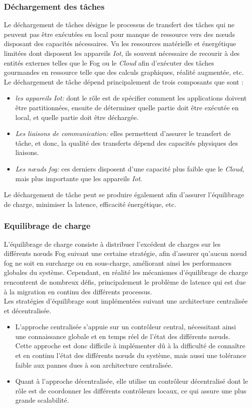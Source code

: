\subsubsection{Déchargement des tâches}
Le déchargement de tâches désigne le processus de transfert des tâches qui ne peuvent pas être exécutées en local pour manque de ressource vers des nœuds disposant des capacités nécessaires. Vu les ressources matérielle et énergétique limitées dont disposent les appareils \emph{Iot}, ils souvent nécessaire de recourir à des entités externes telles que le Fog ou le \emph{Cloud} afin d'exécuter des tâches gourmandes en ressource telle que des calculs graphiques, réalité augmentée, etc.\\
Le déchargement de tâche dépend principalement de trois composants que sont :
\begin{itemize}
  \item \emph{les appareils Iot:} dont le rôle est de spécifier comment les applications doivent être partitionnées, ensuite de déterminer quelle partie doit être exécutée en local, et quelle partie doit être déchargée.
  \item \emph{Les liaisons de communication:}  elles permettent d’assurer le transfert de tâche, et donc, la qualité des transferts dépend des capacités physiques des liaisons.
  \item \emph{Les nœuds fog:} ces derniers disposent d'une capacité plus faible que le \emph{Cloud}, mais plus importante que les appareils \emph{Iot}.
\end{itemize}
Le déchargement de tâche peut se produire également afin d’assurer l’équilibrage de charge, minimiser la latence, efficacité énergétique, etc.
\subsubsection{Equilibrage de charge}
L’équilibrage de charge \cite{Ash2019} consiste à distribuer l'excédent de charges sur les différents nœuds Fog suivant une certaine stratégie, afin d’assurer qu’aucun nœud fog ne soit en surcharge ou en sous-charge, améliorant ainsi les performances globales du système. Cependant, en réalité les mécanismes d’équilibrage de charge rencontrent de nombreux défis, principalement le problème de latence qui est due à la migration en continu des différents processus.\\
Les stratégies d'équilibrage sont implémentées suivant une architecture centralisée et décentralisée.
\begin{itemize}
  \item L’approche centralisée s’appuie sur un contrôleur central, nécessitant ainsi une connaissance globale et en temps réel de l’état des différents nœuds.
  Cette approche est donc difficile à implémenter dû à la difficulté de connaître et en continu l’état des différents nœuds du système, mais aussi une tolérance faible aux pannes dues à son architecture centralisée.
  \item Quant à l’approche décentralisée, elle utilise un contrôleur décentralisé dont le rôle est de coordonner les différents contrôleurs locaux, ce qui assure une plus grande scalabilité.
\end{itemize}
